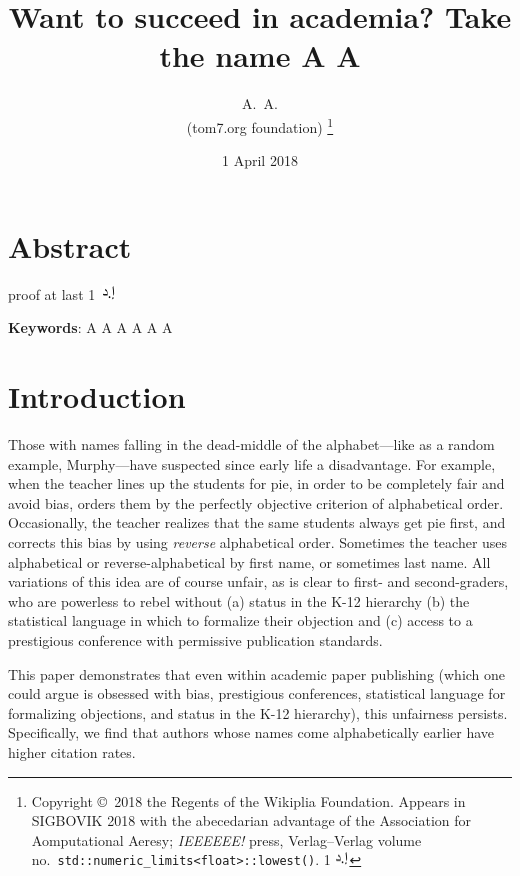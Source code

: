 \documentclass[twocolumn]{article}
\newcommand\dirham{\protect \includegraphics[width=1em]{dirham}}
\begin{document}
 


\title{Want to succeed in academia? Take the name A A}
\author{A.~A. \\
  (tom7.org foundation)
  \thanks{
    Copyright \copyright\ 2018 the Regents of the Wikiplia Foundation.
    Appears in SIGBOVIK 2018 with the abecedarian advantage of the
    Association for Aomputational Aeresy; {\em IEEEEEE!} press,
    Verlag--Verlag volume no.~{\tt std::numeric\_limits<float>::lowest()}.
    1 \dirham
} }

\renewcommand\>{$>$}
\newcommand\<{$<$}

\date{1 April 2018}

\maketitle

\section*{Abstract}
proof at last
    1\ \dirham

\vspace{1em}
{\noindent \small {\bf Keywords}:
  A A A A A A
}

\section{Introduction}

Those with names falling in the dead-middle of the alphabet---like as
a random example, Murphy---have suspected since early life a
disadvantage. For example, when the teacher lines up the students for
pie, in order to be completely fair and avoid bias, orders them by the
perfectly objective criterion of alphabetical order. Occasionally, the
teacher realizes that the same students always get pie first, and
corrects this bias by using {\em reverse} alphabetical order.
Sometimes the teacher uses alphabetical or reverse-alphabetical by
first name, or sometimes last name. All variations of this idea are of
course unfair, as is clear to first- and second-graders, who are
powerless to rebel without (a) status in the K-12 hierarchy (b) the
statistical language in which to formalize their objection and (c)
access to a prestigious conference with permissive publication
standards.

This paper demonstrates that even within academic paper publishing
(which one could argue is obsessed with bias, prestigious conferences,
statistical language for formalizing objections, and status in the
K-12 hierarchy), this unfairness persists. Specifically, we find that
authors whose names come alphabetically earlier have higher citation
rates.
\end{document}
